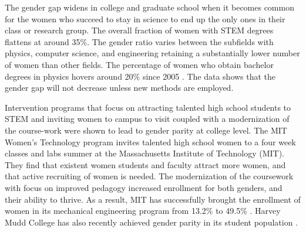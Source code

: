 \documentclass[utf8]{frontiersSCNS} %
\begin{document}
The gender gap widens in college and graduate school when it becomes common for the women who succeed to stay in science to end up the only ones in their class or research group.  The overall fraction of women with STEM degrees flattens at around 35\%.  The gender ratio varies between the subfields with physics, computer science, and engineering retaining a substantially lower number of women than other fields.  The percentage of women who obtain bachelor degrees in physics hovers around 20\% since 2005 \citep{apsData}. The data shows that the gender gap will not decrease unless new methods are employed.

Intervention programs that focus on attracting talented high school students to STEM and inviting women to campus to visit coupled with a modernization of the course-work were shown to lead to gender parity at college level.  The MIT Women's Technology program invites talented high school women to a four week classes and labs summer at the Massachusetts Institute of Technology (MIT). They find that existent women students and faculty attract more women, and that active recruiting of women is needed.  The modernization of the coursework with focus on improved pedagogy increased enrollment for both genders, and their ability to thrive. As a result, MIT has successfully brought the enrollment of women in its mechanical engineering program from 13.2\% to 49.5\% \citep{MITpress}. Harvey Mudd College has also recently achieved gender parity in its student population \citep{loftus2015piercing,helble2017our}.
\end{document}
